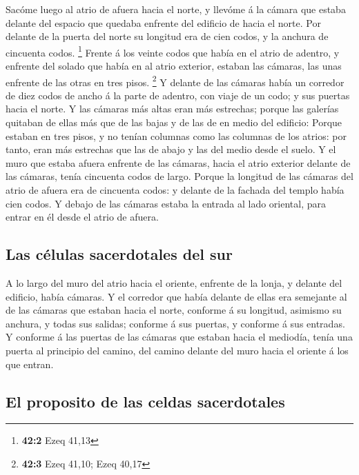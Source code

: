  Sacóme luego al atrio de afuera hacia el norte, y llevóme á
la cámara que estaba delante del espacio que quedaba enfrente del
edificio de hacia el norte.  Por delante de la puerta del
norte su longitud era de cien codos, y la anchura de cincuenta codos.
\footnote{\textbf{42:2} Ezeq 41,13}  Frente á los veinte
codos que había en el atrio de adentro, y enfrente del solado que había
en al atrio exterior, estaban las cámaras, las unas enfrente de las
otras en tres pisos. \footnote{\textbf{42:3} Ezeq 41,10; Ezeq 40,17}
 Y delante de las cámaras había un corredor de diez codos de
ancho á la parte de adentro, con viaje de un codo; y sus puertas hacia
el norte.  Y las cámaras más altas eran más estrechas;
porque las galerías quitaban de ellas más que de las bajas y de las de
en medio del edificio:  Porque estaban en tres pisos, y no
tenían columnas como las columnas de los atrios: por tanto, eran más
estrechas que las de abajo y las del medio desde el suelo. 
Y el muro que estaba afuera enfrente de las cámaras, hacia el atrio
exterior delante de las cámaras, tenía cincuenta codos de largo.
 Porque la longitud de las cámaras del atrio de afuera era
de cincuenta codos: y delante de la fachada del templo había cien codos.
 Y debajo de las cámaras estaba la entrada al lado oriental,
para entrar en él desde el atrio de afuera.

\hypertarget{las-cuxe9lulas-sacerdotales-del-sur}{%
\subsection{Las células sacerdotales del
sur}\label{las-cuxe9lulas-sacerdotales-del-sur}}

 A lo largo del muro del atrio hacia el oriente, enfrente
de la lonja, y delante del edificio, había cámaras.  Y el
corredor que había delante de ellas era semejante al de las cámaras que
estaban hacia el norte, conforme á su longitud, asimismo su anchura, y
todas sus salidas; conforme á sus puertas, y conforme á sus entradas.
 Y conforme á las puertas de las cámaras que estaban hacia
el mediodía, tenía una puerta al principio del camino, del camino
delante del muro hacia el oriente á los que entran.

\hypertarget{el-proposito-de-las-celdas-sacerdotales}{%
\subsection{El proposito de las celdas
sacerdotales}\label{el-proposito-de-las-celdas-sacerdotales}}


